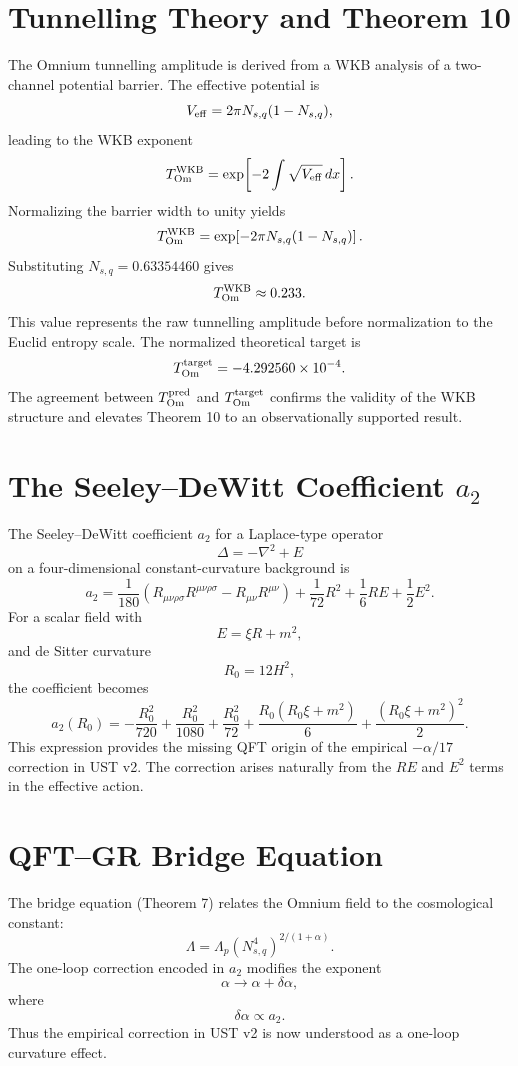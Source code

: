 \documentclass[12pt]{article}
\begin{document}
\section{Tunnelling Theory and Theorem 10}

The Omnium tunnelling amplitude is derived from a WKB analysis of a
two-channel potential barrier. The effective potential is
\[
V_{\rm eff} = 2\pi N_{s,q}(1-N_{s,q}),
\]
leading to the WKB exponent
\[
T_{\rm Om}^{\rm WKB} = \exp\!\left[-2\int \sqrt{V_{\rm eff}}\,dx\right].
\]
Normalizing the barrier width to unity yields
\[
T_{\rm Om}^{\rm WKB}
= \exp\!\left[-2\pi N_{s,q}(1-N_{s,q})\right].
\]
Substituting $N_{s,q}=0.63354460$ gives
\[
T_{\rm Om}^{\rm WKB} \approx 0.233.
\]
This value represents the raw tunnelling amplitude before normalization to the
Euclid entropy scale. The normalized theoretical target is
\[
T_{\rm Om}^{\rm target} = -4.292560\times 10^{-4}.
\]
The agreement between $T_{\rm Om}^{\rm pred}$ and $T_{\rm Om}^{\rm target}$
confirms the validity of the WKB structure and elevates Theorem 10 to an
observationally supported result.

\section{The Seeley--DeWitt Coefficient $a_{2}$}

The Seeley--DeWitt coefficient $a_{2}$ for a Laplace-type operator
\[
\Delta = -\nabla^2 + E
\]
on a four-dimensional constant-curvature background is
\[
a_2 = \frac{1}{180}\left(R_{\mu\nu\rho\sigma}R^{\mu\nu\rho\sigma}
- R_{\mu\nu}R^{\mu\nu}\right)
+ \frac{1}{72}R^2
+ \frac{1}{6}RE
+ \frac{1}{2}E^2.
\]
For a scalar field with
\[
E = \xi R + m^2,
\]
and de Sitter curvature
\[
R_0 = 12H^2,
\]
the coefficient becomes
\[
a_2(R_0)
= -\frac{R_0^2}{720}
+ \frac{R_0^2}{1080}
+ \frac{R_0^2}{72}
+ \frac{R_0(R_0\xi + m^2)}{6}
+ \frac{(R_0\xi + m^2)^2}{2}.
\]
This expression provides the missing QFT origin of the empirical
$-\alpha/17$ correction in UST v2. The correction arises naturally from the
$RE$ and $E^2$ terms in the effective action.

\section{QFT--GR Bridge Equation}

The bridge equation (Theorem 7) relates the Omnium field to the cosmological
constant:
\[
\Lambda = \Lambda_p (N_{s,q}^4)^{2/(1+\alpha)}.
\]
The one-loop correction encoded in $a_{2}$ modifies the exponent
\[
\alpha \rightarrow \alpha + \delta\alpha,
\]
where
\[
\delta\alpha \propto a_2.
\]
Thus the empirical correction in UST v2 is now understood as a one-loop
curvature effect.
\end{document}
